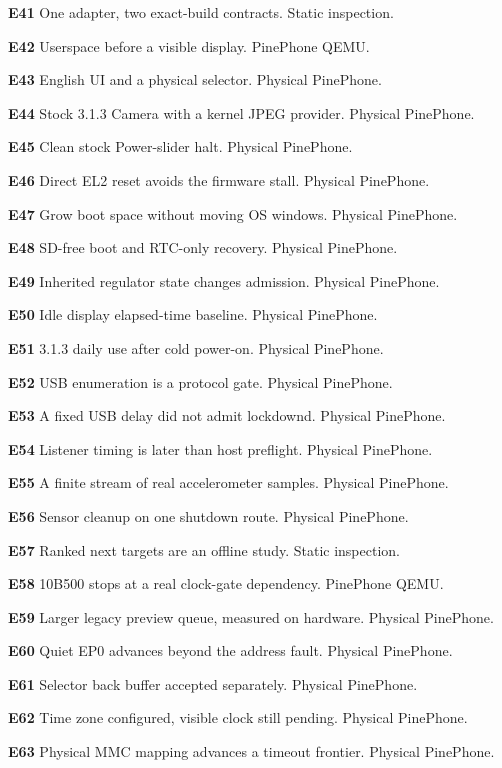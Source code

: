 \documentclass[10pt,letterpaper,twocolumn]{article}
\begin{document}
\noindent\hypertarget{e-E41}{\textbf{E41}} One adapter, two exact-build contracts. Static inspection.

\noindent\hypertarget{e-E42}{\textbf{E42}} Userspace before a visible display. PinePhone QEMU.

\noindent\hypertarget{e-E43}{\textbf{E43}} English UI and a physical selector. Physical PinePhone.

\noindent\hypertarget{e-E44}{\textbf{E44}} Stock 3.1.3 Camera with a kernel JPEG provider. Physical PinePhone.

\noindent\hypertarget{e-E45}{\textbf{E45}} Clean stock Power-slider halt. Physical PinePhone.

\noindent\hypertarget{e-E46}{\textbf{E46}} Direct EL2 reset avoids the firmware stall. Physical PinePhone.

\noindent\hypertarget{e-E47}{\textbf{E47}} Grow boot space without moving OS windows. Physical PinePhone.

\noindent\hypertarget{e-E48}{\textbf{E48}} SD-free boot and RTC-only recovery. Physical PinePhone.

\noindent\hypertarget{e-E49}{\textbf{E49}} Inherited regulator state changes admission. Physical PinePhone.

\noindent\hypertarget{e-E50}{\textbf{E50}} Idle display elapsed-time baseline. Physical PinePhone.

\noindent\hypertarget{e-E51}{\textbf{E51}} 3.1.3 daily use after cold power-on. Physical PinePhone.

\noindent\hypertarget{e-E52}{\textbf{E52}} USB enumeration is a protocol gate. Physical PinePhone.

\noindent\hypertarget{e-E53}{\textbf{E53}} A fixed USB delay did not admit lockdownd. Physical PinePhone.

\noindent\hypertarget{e-E54}{\textbf{E54}} Listener timing is later than host preflight. Physical PinePhone.

\noindent\hypertarget{e-E55}{\textbf{E55}} A finite stream of real accelerometer samples. Physical PinePhone.

\noindent\hypertarget{e-E56}{\textbf{E56}} Sensor cleanup on one shutdown route. Physical PinePhone.

\noindent\hypertarget{e-E57}{\textbf{E57}} Ranked next targets are an offline study. Static inspection.

\noindent\hypertarget{e-E58}{\textbf{E58}} 10B500 stops at a real clock-gate dependency. PinePhone QEMU.

\noindent\hypertarget{e-E59}{\textbf{E59}} Larger legacy preview queue, measured on hardware. Physical PinePhone.

\noindent\hypertarget{e-E60}{\textbf{E60}} Quiet EP0 advances beyond the address fault. Physical PinePhone.

\noindent\hypertarget{e-E61}{\textbf{E61}} Selector back buffer accepted separately. Physical PinePhone.

\noindent\hypertarget{e-E62}{\textbf{E62}} Time zone configured, visible clock still pending. Physical PinePhone.

\noindent\hypertarget{e-E63}{\textbf{E63}} Physical MMC mapping advances a timeout frontier. Physical PinePhone.

\normalsize
\end{document}
